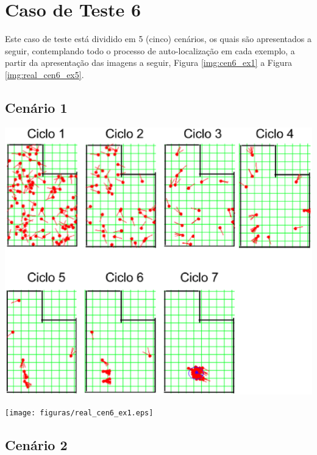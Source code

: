 \section{Caso de Teste 6}
\label{sec:cenario6}

Este caso de teste está dividido em 5 (cinco) cenários, os quais são apresentados a seguir, contemplando todo o processo de auto-localização
em cada exemplo, a partir da apresentação das imagens a seguir, Figura \ref{img:cen6_ex1} a Figura \ref{img:real_cen6_ex5}.

\subsection{Cenário 1}

{\centering
\includegraphics[scale=0.4]{figuras/cen6_ex1.eps}
\label{img:cen6_ex1}
\par}

{\centering
\texttt{[image: figuras/real\_cen6\_ex1.eps]}
\label{img:real_cen6_ex1}
\par}

\subsection{Cenário 2}

